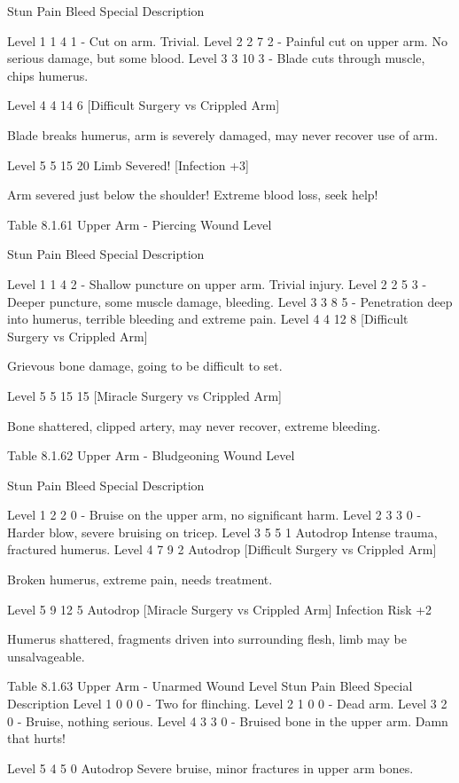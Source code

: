 \documentclass[oneside,11pt,english]{book}
\begin{document}
Stun Pain Bleed Special Description 

Level 1 1 4 1 - Cut on arm. Trivial. 
Level 2 2 7 2 - Painful cut on upper arm. No serious damage, but 
some blood. 
Level 3 3 10 3 - Blade cuts through muscle, chips humerus. 


Level 4 4 14 6 [Difficult Surgery vs 
Crippled Arm] 

Blade breaks humerus, arm is severely damaged, 
may never recover use of arm. 

Level 5 5 15 20 Limb Severed! 
[Infection +3] 

Arm severed just below the shoulder! Extreme 
blood loss, seek help! 

 
Table 8.1.61 Upper Arm - Piercing 
Wound 
Level 

Stun Pain Bleed Special Description 

Level 1 1 4 2 - Shallow puncture on upper arm. Trivial injury. 
Level 2 2 5 3 - Deeper puncture, some muscle damage, 
bleeding. 
Level 3 3 8 5 - Penetration deep into humerus, terrible bleeding 
and extreme pain. 
Level 4 4 12 8 [Difficult Surgery vs 
Crippled Arm] 

Grievous bone damage, going to be difficult to 
set. 

Level 5 5 15 15 [Miracle Surgery vs 
Crippled Arm] 

Bone shattered, clipped artery, may never 
recover, extreme bleeding. 

 
Table 8.1.62 Upper Arm - Bludgeoning 
Wound 
Level 

Stun Pain Bleed Special Description 

Level 1 2 2 0 - Bruise on the upper arm, no significant harm. 
Level 2 3 3 0 - Harder blow, severe bruising on tricep. 
Level 3 5 5 1 Autodrop Intense trauma, fractured humerus. 
Level 4 7 9 2 Autodrop [Difficult Surgery vs 
Crippled Arm] 

Broken humerus, extreme pain, needs 
treatment. 

Level 5 9 12 5 Autodrop [Miracle Surgery vs 
Crippled Arm] Infection Risk 
+2 

Humerus shattered, fragments driven into 
surrounding flesh, limb may be 
unsalvageable. 

 
Table 8.1.63 Upper Arm - Unarmed 
Wound Level Stun Pain Bleed Special Description 
Level 1 0 0 0 - Two for flinching. 
Level 2 1 0 0 - Dead arm. 
Level 3 2 0 - Bruise, nothing serious. 
Level 4 3 3 0 - Bruised bone in the upper arm. Damn that hurts! 


Level 5 4 5 0 Autodrop Severe bruise, minor fractures in upper arm bones. 
\end{document}
